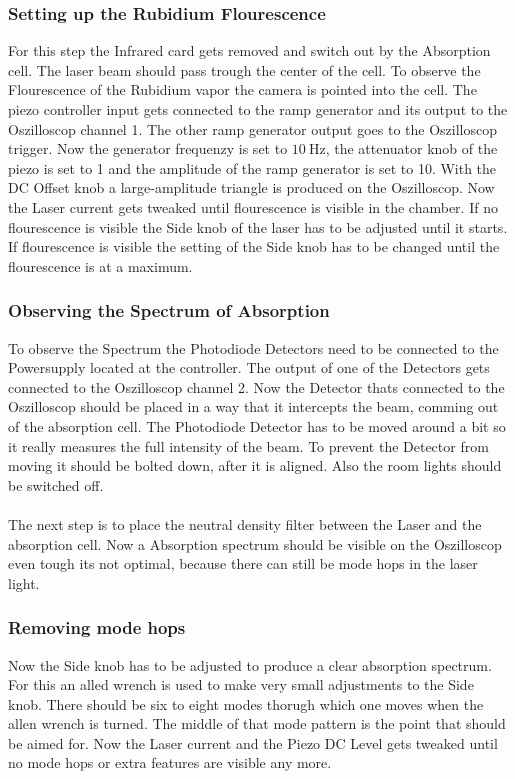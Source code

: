\subsubsection{Setting up the Rubidium Flourescence}
\label{sec:flourescence}
For this step the Infrared card gets removed and switch out by the Absorption cell.
The laser beam should pass trough the center of the cell.
To observe the Flourescence of the Rubidium vapor the camera is pointed into the cell.
The piezo controller input gets connected to the ramp generator and its output to the Oszilloscop channel 1.
The other ramp generator output goes to the Oszilloscop trigger.
Now the generator frequenzy is set to $\SI{10}{\Hz}$, the attenuator knob of the piezo is set to 1 and the amplitude of the ramp generator is set to 10.
With the DC Offset knob a large-amplitude triangle is produced on the Oszilloscop.
Now the Laser current gets tweaked until flourescence is visible in the chamber.
If no flourescence is visible the Side knob of the laser has to be adjusted until it starts.
If flourescence is visible the setting of the Side knob has to be changed until the flourescence is at a maximum.

\subsubsection{Observing the Spectrum of Absorption}
To observe the Spectrum the Photodiode Detectors need to be connected to the Powersupply located at the controller.
The output of one of the Detectors gets connected to the Oszilloscop channel 2.
Now the Detector thats connected to the Oszilloscop should be placed in a way that it intercepts the beam, comming out of the absorption cell.
The Photodiode Detector has to be moved around a bit so it really measures the full intensity of the beam.
To prevent the Detector from moving it should be bolted down, after it is aligned.
Also the room lights should be switched off.
\\\\
The next step is to place the neutral density filter between the Laser and the absorption cell.
Now a Absorption spectrum should be visible on the Oszilloscop even tough its not optimal, because there can still be mode hops in the laser light.

\subsubsection{Removing mode hops}
Now the Side knob has to be adjusted to produce a clear absorption spectrum.
For this an alled wrench is used to make very small adjustments to the Side knob.
There should be six to eight modes thorugh which one moves when the allen wrench is turned.
The middle of that mode pattern is the point that should be aimed for.
Now the Laser current and the Piezo DC Level gets tweaked until no mode hops or extra features are visible any more.

